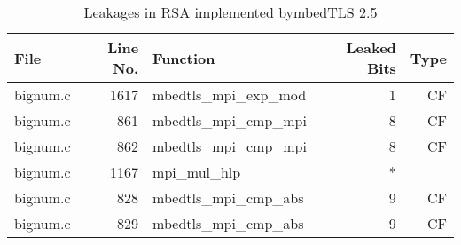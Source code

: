 \begin{table}%
\centering\tiny\scriptsize
\renewcommand{\baselinestretch}{0.96}\selectfont
\caption{Leakages in RSA implemented bymbedTLS 2.5}\label{tab:RSAmbedTLS2.5}
\begin{tabular}{lrlrr}
\hline
\textbf{File} & \textbf{Line No.} & \textbf{Function} & \textbf{Leaked Bits} & \textbf{Type} \\\hline
bignum.c& 1617&mbedtls\_mpi\_exp\_mod&1 &CF\\
bignum.c& 861&mbedtls\_mpi\_cmp\_mpi&8 &CF\\
bignum.c& 862&mbedtls\_mpi\_cmp\_mpi&8 &CF\\
bignum.c& 1167&mpi\_mul\_hlp&*&\\
bignum.c& 828&mbedtls\_mpi\_cmp\_abs&9 &CF\\
bignum.c& 829&mbedtls\_mpi\_cmp\_abs&9 &CF\\
\hline
\end{tabular}
\renewcommand{\baselinestretch}{1.0}\selectfont
\end{table}
